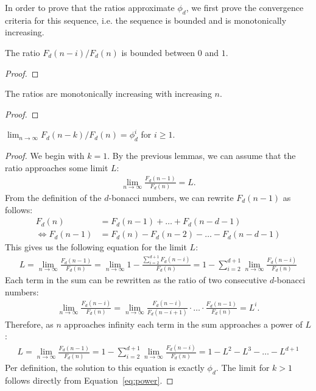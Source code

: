 \documentclass[english,version-2020-11]{uzl-thesis}
\begin{document}
In order to prove that the ratios approximate $\phi_d$,
we first prove the convergence criteria for this sequence, i.e.
the sequence is bounded and is monotonically increasing.

\begin{lemma}
  The ratio $F_d(n - i) / F_d(n)$ is bounded between $0$ and $1$.
\end{lemma}

\begin{proof}

\end{proof}

\begin{lemma}
  The ratios are monotonically increasing with increasing $n$.
\end{lemma}

\begin{proof}

\end{proof}

\begin{theorem}
  $\lim_{n \to \infty} F_d(n - k) / F_d(n) = \phi_d^i$ for $i \ge 1$.
\end{theorem}

\begin{proof}
  We begin with $k = 1$.
  By the previous lemmas, we can assume that the ratio approaches some limit $L$:
  \begin{align*}
    \lim_{n \to \infty} \frac{F_d(n - 1)}{F_d(n)} = L.
  \end{align*}
  From the definition of the $d$-bonacci numbers, we can rewrite $F_d(n - 1)$ as follows:
  \begin{align*}
    F_d(n) & = F_d(n - 1) + \dots + F_d(n - d - 1) \\
    \Leftrightarrow F_d(n - 1) & = F_d(n) - F_d(n - 2) - \dots - F_d(n - d - 1)
  \end{align*}
  This gives us the following equation for the limit $L$:
  \begin{align*}
    L = \lim_{n \to \infty} \frac{F_d(n - 1)}{F_d(n)}
      = \lim_{n \to \infty} 1 - \frac{\sum_{i=2}^{d+1} F_d(n - i)}{F_d(n)}
      = 1 - \sum_{i=2}^{d+1} \lim_{n \to \infty} \frac{F_d(n - i)}{F_d(n)}
  \end{align*}
  Each term in the sum can be rewritten as the ratio of two consecutive $d$-bonacci numbers:
  \begin{align}
    \label{eq:power}
    \lim_{n\to\infty} \frac{F_d(n - i)}{F_d(n)} = \lim_{n\to\infty}\frac{F_d(n - i)}{F_d(n - i + 1)} \cdot \ldots \cdot \frac{F_d(n - 1)}{F_d(n)} = L^i.
  \end{align}
  Therefore, as $n$ approaches infinity each term in the sum approaches a power of $L$:
  \begin{align*}
    L = \lim_{n \to \infty} \frac{F_d(n - 1)}{F_d(n)}
      = 1 - \sum_{i=2}^{d+1} \lim_{n \to \infty} \frac{F_d(n - i)}{F_d(n)}
      = 1 - L^2 - L^3 - \dots - L^{d+1}
  \end{align*}
  Per definition, the solution to this equation is exactly $\phi_d$.
  The limit for $k > 1$ follows directly from Equation~\ref{eq:power}.
\end{proof}
\end{document}
